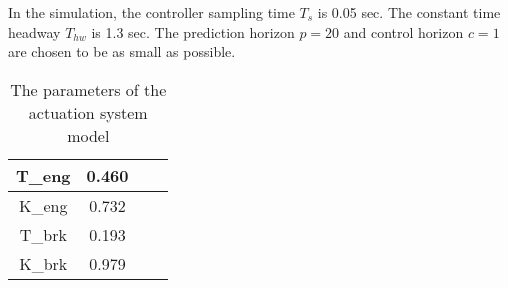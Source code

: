 In the simulation, the controller sampling time $T_s$ is 0.05 sec. The constant time headway $T_{hw}$ is 1.3 sec. The prediction horizon $p=20$ and control horizon $c=1$ are chosen to be as small as possible. 


\begin{table}[h]
\begin{center}
\caption{The parameters of the actuation system model}
\begin{tabular}{| c | c | c | c |} %
\hline
T_{eng} & 0.460 \\
\hline
K_{eng} & 0.732 \\
\hline
T_{brk} & 0.193 \\
\hline
K_{brk} & 0.979 \\
\hline
\end{tabular}
\label{Tab parameters}

\end{center}
\end{table}
